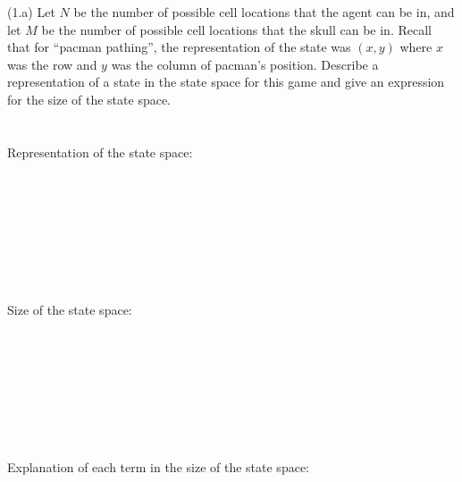 \documentclass{article}
\begin{document}
\noindent (1.a) Let $N$ be the number of possible cell locations that the agent can be in, and let $M$ be the number of possible cell locations that the skull can be in. Recall that for ``pacman pathing'', the representation of the state was $(x, y)$ where $x$ was the row and $y$ was the column of pacman's position.
Describe a representation of a state in the state space for this game and give an expression for the size of the state space. \\
~\\
~\\
Representation of the state space: \\
~\\
~\\
~\\
~\\
~\\
~\\
~\\
~\\
Size of the state space:\\
~\\
~\\
~\\
~\\
~\\
~\\
~\\
~\\
Explanation of each term in the size of the state space:\\
~\\
~\\
~\\
~\\
~\\
~\\
~\\
~\\
\newpage
\end{document}

